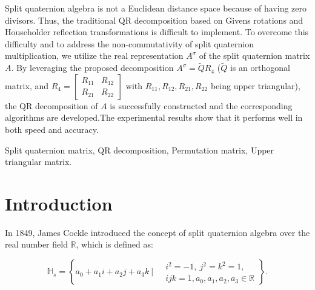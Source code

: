 \documentclass[conference]{IEEEtran}
\numberwithin{equation}{section}
\renewenvironment{abstract}{%
  \noindent\bfseries \abstractname \par%
  \normalfont
  \list{}{%
    \leftmargin=0cm%
    \rightmargin=0cm%
  }%
  \item\relax
}{%
  \endlist
}
\begin{document}
\begin{abstract}
Split quaternion algebra is not a Euclidean distance space because of having zero divisors. Thus, the traditional QR decomposition based on Givens rotations and Householder reflection transformations is difficult to implement. To overcome this difficulty and to address the non-commutativity of split quaternion multiplication, we utilize the real representation $A^\sigma$ of the split quaternion matrix $A$. By leveraging the proposed decomposition $A^\sigma = \widetilde{Q}R_4$ ($\widetilde{Q}$ is an orthogonal matrix, and $R_4 = \begin{bmatrix} R_{11} & R_{12} \\ R_{21} & R_{22} \end{bmatrix}$ with $R_{11}, R_{12}, R_{21}, R_{22}$ being upper triangular), the QR decomposition of $A$ is successfully constructed and the corresponding algorithms are developed.The experimental results show that it performs well in both speed and accuracy.
\end{abstract}

\begin{IEEEkeywords}
Split quaternion matrix, QR decomposition, Permutation matrix, Upper triangular matrix.
\end{IEEEkeywords}


\section{Introduction}
In 1849, James Cockle \cite{Cockle1849} introduced the concept of split quaternion algebra over the real number field $\mathbb{R}$, which is defined as:

\begin{equation*}
    \mathbb{H}_s = \left\{ a_0 + a_1 i + a_2 j + a_3 k \ \bigg| \ 
    \begin{aligned}
    &i^2 = -1,\ j^2 = k^2 = 1, \\ &ijk = 1,
    a_0, a_1, a_2, a_3 \in \mathbb{R}
    \end{aligned}
    \right\}. 
\end{equation*}
\end{document}
